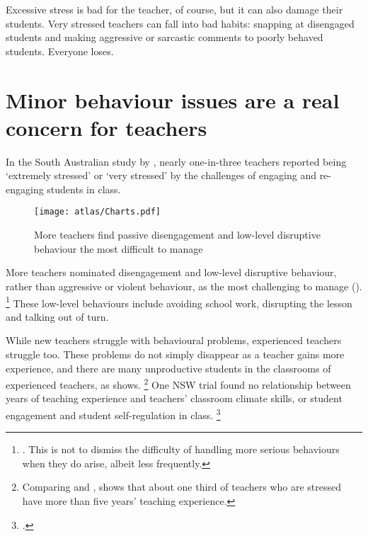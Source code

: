 \documentclass[FrontPage]{grattan}
\begin{document}
Excessive stress is bad for the teacher, of course, but it can also damage their students. Very stressed teachers can fall into bad habits: snapping at disengaged students and making aggressive or sarcastic comments to poorly behaved students. Everyone loses.
 
\section{Minor behaviour issues are a real concern for teachers}\label{sec:minor-behavioural-issues}
In the South Australian study by \textcite{Sullivan2014PunishThemEngage}, nearly one-in-three teachers reported being ‘extremely stressed' or ‘very stressed' by the challenges of engaging and re-engaging students in class.%

\begin{figure}
\caption{More teachers find passive disengagement and low-level disruptive behaviour the most difficult to manage\label{fig:behaviours-most-difficult-manage}}%
\texttt{[image: atlas/Charts.pdf]}%
\end{figure}

More teachers nominated disengagement and low-level disruptive behaviour, rather than aggressive or violent behaviour, as the most challenging to manage ().%
\footnote{\textcite{Sullivan2014PunishThemEngage}. This is not to dismiss the difficulty of handling more serious behaviours when they do arise, albeit less frequently.} These low-level behaviours include avoiding school work, disrupting the lesson and talking out of turn.
\pagebreak[2]  %

While new teachers struggle with behavioural problems, experienced teachers struggle too. These problems do not simply disappear as a teacher gains more experience, and there are many unproductive students in the classrooms of experienced teachers, as  shows.%
    \footnote{Comparing \textcite{Sullivan2014PunishThemEngage} and \textcite{Freeman2014AustralianTeachersLearning}, shows that about one third of teachers who are stressed have more than five years' teaching experience.} 
One NSW trial found no relationship between years of teaching experience and teachers' classroom climate skills, or student engagement and student self-regulation in class.%
    \footcite{Gore2016TeachingExperienceRelative}
\end{document}
